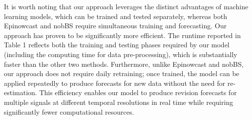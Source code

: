 It is worth noting that our approach leverages the distinct advantages of machine learning models, which can be trained and tested separately, whereas both Epinowcast and nobBS require simultaneous training and forecasting. Our approach has proven to be significantly more efficient. The runtime reported in Table 1 reflects both the training and testing phases required by our model (including the computing time for data pre-processing), which is substantially faster than the other two methods. Furthermore, unlike Epinowcast and nobBS, our approach does not require daily retraining; once trained, the model can be applied repeatedly to produce forecasts for new data without the need for re-estimation. This efficiency enables our model to produce revision forecasts for multiple signals at different temporal resolutions in real time while requiring significantly fewer computational resources.








